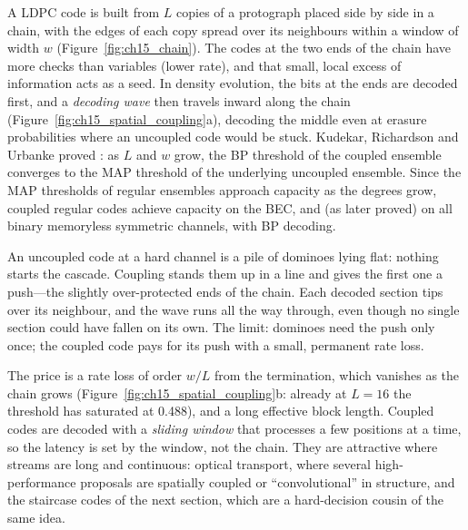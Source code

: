 A  LDPC code is built from $L$ copies of a protograph placed side by side in a
chain, with the edges of each copy spread over its neighbours within a window of width $w$
(Figure~\ref{fig:ch15_chain}). The
codes at the two ends of the chain have more checks than variables (lower rate), and that small,
local excess of information acts as a seed. In density evolution, the bits at the ends are decoded
first, and a \emph{decoding wave} then travels inward along the chain
(Figure~\ref{fig:ch15_spatial_coupling}a), decoding the middle even at erasure probabilities where an
uncoupled code would be stuck. Kudekar, Richardson and Urbanke proved : as
$L$ and $w$ grow, the BP threshold of the coupled ensemble converges to the MAP threshold of the
underlying uncoupled ensemble. Since the MAP thresholds of regular ensembles approach capacity as the
degrees grow, coupled regular codes achieve capacity on the BEC, and (as later proved) on all binary
memoryless symmetric channels, with BP decoding.


\begin{analogy}
An uncoupled code at a hard channel is a pile of dominoes lying flat: nothing starts the cascade.
Coupling stands them up in a line and gives the first one a push---the slightly over-protected ends
of the chain. Each decoded section tips over its neighbour, and the wave runs all the way through,
even though no single section could have fallen on its own. The limit: dominoes need the push only
once; the coupled code pays for its push with a small, permanent rate loss.
\end{analogy}

The price is a rate loss of order $w/L$ from the termination, which vanishes as the chain grows
(Figure~\ref{fig:ch15_spatial_coupling}b: already at $L=16$ the threshold has saturated at 0.488), and
a long effective block length. Coupled codes are decoded with a \emph{sliding window} that processes a
few positions at a time, so the latency is set by the window, not the chain. They are attractive where
streams are long and continuous: optical transport, where several high-performance proposals are
spatially coupled or ``convolutional'' in structure, and the staircase codes of the next section,
which are a hard-decision cousin of the same idea.

